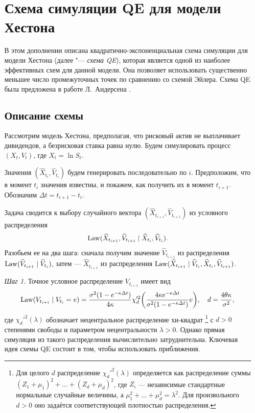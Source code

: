 
\chapter{Схема симуляции QE для модели Хестона}
\label{ch:qe}

В этом дополнении описана квадратично-экспоненциальная схема симуляции для модели Хестона (далее "--- \emph{схема QE}), которая является одной из наиболее эффективных схем для данной модели.
Она позволяет использовать существенно меньшее число промежуточных точек по сравнению со схемой Эйлера.
Схема QE была предложена в работе Л.~Андерсена \cite{Andersen08}.

\section{Описание схемы}
Рассмотрим модель Хестона, предполагая, что рисковый актив не выплачивает дивидендов, а безрисковая ставка равна нулю.
Будем симулировать процесс $(X_t, V_t)$, где $X_t = \ln S_t$.

Значения $(\hat X_{t_i}, \hat V_{t_i})$ будем генерировать последовательно по $i$. Предположим, что в момент $t_i$ значения известны, и покажем, как получить их в момент $t_{i+1}$.
Обозначим $\Delta t = t_{i+1} - t_i$.

Задача сводится к выбору случайного вектора $(\hat X_{t_{i+1}}, \hat V_{t_{i+1}})$ из условного распределения
\[
\operatorname{Law} (\widehat X_{t_{i+1}}, \widehat V_{t_{i+1}} \mid \widehat X_{t_i}, \widehat V_{t_i}).
\]
Разобьем ее на два шага: сначала получим значение $\hat V_{t_{i+1}}$ из распределения $\operatorname{Law}(\widehat V_{t_{i+1}} \mid \widehat V_{t_i})$, затем --- $\hat X_{t_{i+1}}$ из распределения $\operatorname{Law}(\widehat X_{t_{i+1}} \mid \widehat V_{t_i}, \widehat X_{t_i}, \widehat V_{t_{i+1}})$.

\medskip
\textit{Шаг 1.} Точное условное распределение $V_{t_{i+1}}$ имеет вид
\[
\operatorname{Law}(V_{t_{i+1}} \mid V_{t_i} = v ) 
  = \frac{\sigma^2(1-e^{-\kappa\Delta t})}{4\kappa} 
  \chi_d'^2\biggl(
    \frac{4\kappa e^{-\kappa\Delta t}}{\sigma^2(1-e^{-\kappa\Delta t})}v
  \biggr), \quad
d = \frac{4\theta\kappa}{\sigma^2},
\]
где $\chi_d'^2(\lambda)$ обозначает нецентральное распределение хи-квадрат%
\footnote{Для целого $d$ распределение $\chi_d'^2(\lambda)$ определяется как распределение суммы $(Z_1 + \mu_1)^2 + \ldots + (Z_d+\mu_d)^2$, где $Z_i$ --- независимые стандартные нормальные случайные величины, а $\mu_1^2 + \ldots + \mu_d^2 = \lambda^2$. Для произвольного $d>0$ оно задаётся соответствующей плотностью распределения.}
с $d>0$ степенями свободы и параметром нецентральности $\lambda > 0$.
Однако прямая симуляция из такого распределения вычислительно затруднительна.
Ключевая идея схемы QE состоит в том, чтобы использовать приближения.

